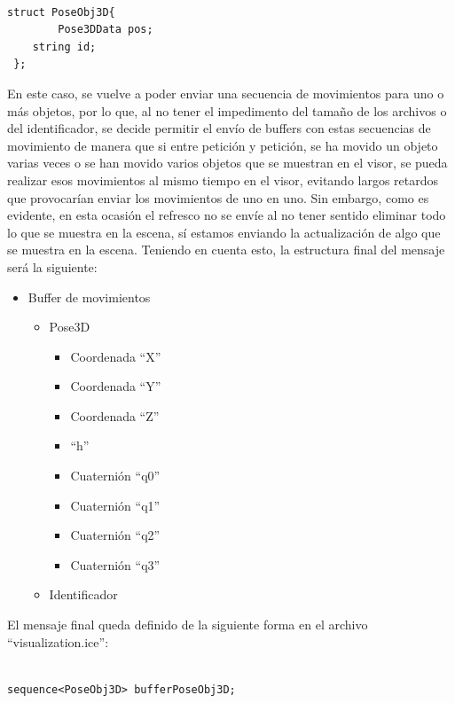 \begin{lstlisting}[frame=single]

struct PoseObj3D{
    	Pose3DData pos;
	string id;
 };
\end{lstlisting}

En este caso, se vuelve a poder enviar una secuencia de movimientos para uno o más objetos, por lo que, al no tener el impedimento del tamaño de los archivos o del identificador, se decide permitir el envío de buffers con estas secuencias de movimiento de manera que si entre petición y petición, se ha movido un objeto varias veces o se han movido varios objetos que se muestran en el visor, se pueda realizar esos movimientos al mismo tiempo en el visor, evitando largos retardos que provocarían enviar los movimientos de uno en uno. Sin embargo, como es evidente, en esta ocasión el refresco no se envíe al no tener sentido eliminar todo lo que se muestra en la escena, sí estamos enviando la actualización de algo que se muestra en la escena. Teniendo en cuenta esto, la estructura final del mensaje será la siguiente:
\begin{itemize}
	\item Buffer de movimientos
	\begin{itemize}
		\item	Pose3D
		\begin{itemize}
			\item Coordenada ``X''
			\item Coordenada ``Y''
			\item Coordenada ``Z''
			\item ``h''
			\item Cuaternión ``q0''
			\item Cuaternión ``q1''
			\item Cuaternión ``q2''
			\item Cuaternión ``q3''
		\end{itemize}
		\item Identificador
	\end{itemize}
\end{itemize}

El mensaje final queda definido de la siguiente forma en el archivo ``visualization.ice'':

\begin{lstlisting}[frame=single]

sequence<PoseObj3D> bufferPoseObj3D;

\end{lstlisting}

